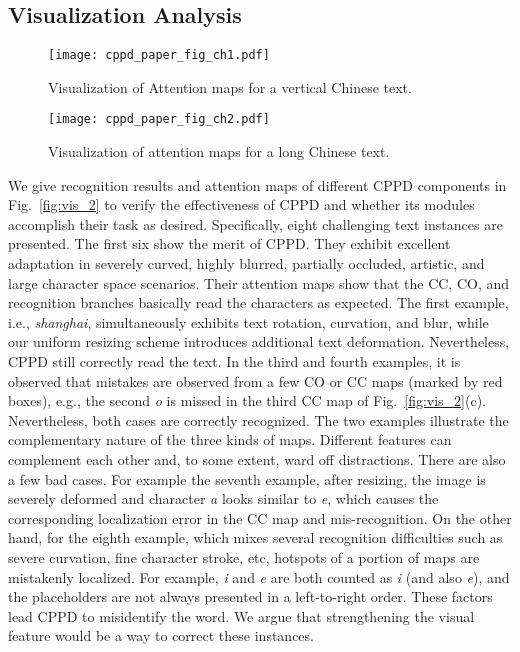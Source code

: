 \documentclass[10pt,journal,compsoc]{IEEEtran}
\begin{document}
\subsection{Visualization Analysis}


\begin{figure}[t]  
\centering  
\texttt{[image: cppd\_paper\_fig\_ch1.pdf]}  
\caption{Visualization of Attention maps for a vertical Chinese text.}  
\label{fig:ch1}  
\end{figure}


\begin{figure}[t]  
\centering  
\texttt{[image: cppd\_paper\_fig\_ch2.pdf]}  
\caption{Visualization of attention maps for a long Chinese text. }  
\label{fig:ch2}  
\end{figure}

We give recognition results and attention maps of different CPPD components in Fig.~\ref{fig:vis_2} to verify the effectiveness of CPPD and whether its modules accomplish their task as desired. Specifically, eight challenging text instances are presented. The first six show the merit of CPPD. They exhibit excellent adaptation in severely curved, highly blurred, partially occluded, artistic, and large character space scenarios. Their attention maps show that the CC, CO, and recognition branches basically read the characters as expected. The first example, i.e., \emph{shanghai}, simultaneously exhibits text rotation, curvation, and blur, while our uniform resizing scheme introduces additional text deformation. Nevertheless, CPPD still correctly read the text. In the third and fourth examples, it is observed that mistakes are observed from a few CO or CC maps (marked by red boxes), e.g., the second \emph{o} is missed in the third CC map of Fig.~\ref{fig:vis_2}(c). Nevertheless, both cases are correctly recognized. The two examples illustrate the complementary nature of the three kinds of maps. Different features can complement each other and, to some extent, ward off distractions. There are also a few bad cases. For example the seventh example, after resizing, the image is severely deformed and character \emph{a} looks similar to \emph{e}, which causes the corresponding localization error in the CC map and mis-recognition. On the other hand, for the eighth example, which mixes several recognition difficulties such as severe curvation, fine character stroke, etc, hotspots of a portion of maps are mistakenly localized. For example, \emph{i} and \emph{e} are both counted as \emph{i} (and also \emph{e}), and the placeholders are not always presented in a left-to-right order. These factors lead CPPD to misidentify the word. We argue that strengthening the visual feature would be a way to correct these instances. 
\end{document}
